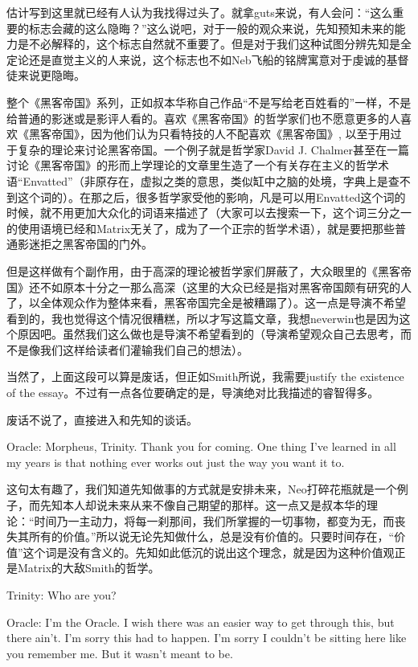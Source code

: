 \documentclass[UTF8]{ctexart}
\newenvironment{myquote}{\color{green} \setlength{\leftskip}{6em} \setlength{\rightskip}{4em} \setlength{\parindent}{-2em}}{\par}
\begin{document}
估计写到这里就已经有人认为我找得过头了。就拿guts来说，有人会问：“这么重要的标志会藏的这么隐晦？”这么说吧，对于一般的观众来说，先知预知未来的能力是不必解释的，这个标志自然就不重要了。但是对于我们这种试图分辨先知是全定论还是直觉主义的人来说，这个标志也不如Neb飞船的铭牌寓意对于虔诚的基督徒来说更隐晦。

整个《黑客帝国》系列，正如叔本华称自己作品“不是写给老百姓看的”一样，不是给普通的影迷或是影评人看的。喜欢《黑客帝国》的哲学家们也不愿意更多的人喜欢《黑客帝国》，因为他们认为只看特技的人不配喜欢《黑客帝国》, 以至于用过于复杂的理论来讨论黑客帝国。一个例子就是哲学家David J. Chalmer甚至在一篇讨论《黑客帝国》的形而上学理论的文章里生造了一个有关存在主义的哲学术语“Envatted”（非原存在，虚拟之类的意思，类似缸中之脑的处境，字典上是查不到这个词的）。在那之后，很多哲学家受他的影响，凡是可以用Envatted这个词的时候，就不用更加大众化的词语来描述了（大家可以去搜索一下，这个词三分之一的使用语境已经和Matrix无关了，成为了一个正宗的哲学术语），就是要把那些普通影迷拒之黑客帝国的门外。

但是这样做有个副作用，由于高深的理论被哲学家们屏蔽了，大众眼里的《黑客帝国》还不如原本十分之一那么高深（这里的大众已经是指对黑客帝国颇有研究的人了，以全体观众作为整体来看，黑客帝国完全是被糟蹋了）。这一点是导演不希望看到的，我也觉得这个情况很糟糕，所以才写这篇文章，我想neverwin也是因为这个原因吧。虽然我们这么做也是导演不希望看到的（导演希望观众自己去思考，而不是像我们这样给读者们灌输我们自己的想法）。

当然了，上面这段可以算是废话，但正如Smith所说，我需要justify the existence of the essay。不过有一点各位要确定的是，导演绝对比我描述的睿智得多。

废话不说了，直接进入和先知的谈话。

\begin{myquote}
Oracle: Morpheus, Trinity. Thank you for coming. One thing I've learned in all my years is that nothing ever works out just the way you want it to.
\end{myquote}

这句太有趣了，我们知道先知做事的方式就是安排未来，Neo打碎花瓶就是一个例子，而先知本人却说未来从来不像自己期望的那样。这一点又是叔本华的理论：“时间乃一主动力，将每一刹那间，我们所掌握的一切事物，都变为无，而丧失其所有的价值。”所以说无论先知做什么，总是没有价值的。只要时间存在，“价值”这个词是没有含义的。先知如此低沉的说出这个理念，就是因为这种价值观正是Matrix的大敌Smith的哲学。

\begin{myquote}
Trinity: Who are you?

Oracle: I'm the Oracle. I wish there was an easier way to get through this, but there ain't. I'm sorry this had to happen. I'm sorry I couldn't be sitting here like you remember me. But it wasn't meant to be.
\end{myquote}
\end{document}
